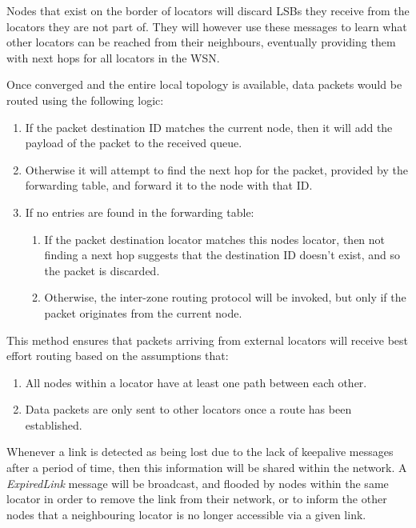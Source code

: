 \documentclass[12pt]{article}
\begin{document}
Nodes that exist on the border of locators will discard LSBs they receive from the locators they are not part of. They will however use these messages to learn what other locators can be reached from their neighbours, eventually providing them with next hops for all locators in the WSN.

Once converged and the entire local topology is available, data packets would be routed using the following logic:

\begin{enumerate}
	\item If the packet destination ID matches the current node, then it will add the payload of the packet to the received queue. 
	\item Otherwise it will attempt to find the next hop for the packet, provided by the forwarding table, and forward it to the node with that ID. 
	\item If no entries are found in the forwarding table:
	\begin{enumerate}
		\item If the packet destination locator matches this nodes locator, then not finding a next hop suggests that the destination ID doesn't exist, and so the packet is discarded. 
		\item Otherwise, the inter-zone routing protocol will be invoked, but only if the packet originates from the current node. 
	\end{enumerate}
\end{enumerate}

This method ensures that packets arriving from external locators will receive best effort routing based on the assumptions that:

\begin{enumerate}
	\item All nodes within a locator have at least one path between each other. 
	\item Data packets are only sent to other locators once a route has been established.
\end{enumerate}

Whenever a link is detected as being lost due to the lack of keepalive messages after a period of time, then this information will be shared within the network. A \emph{ExpiredLink} message will be broadcast, and flooded by nodes within the same locator in order to remove the link from their network, or to inform the other nodes that a neighbouring locator is no longer accessible via a given link.
\end{document}
